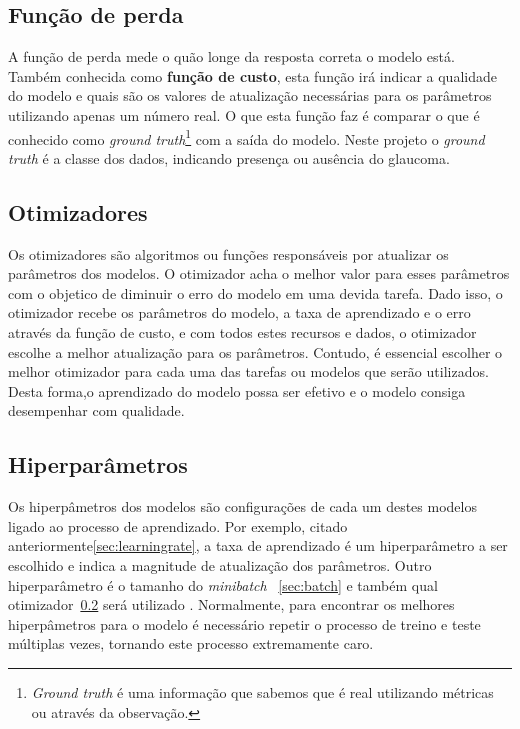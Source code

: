 \documentclass[ %
	msc, %
	portugues %
]{../ppgccufmg}
\begin{document}
    \subsection{Função de perda}\label{sec:loss}

    A função de perda mede o quão longe da resposta correta o modelo está. Também conhecida como
    \textbf{função de custo}, esta função irá indicar a qualidade do modelo e quais são os valores
    de atualização necessárias para os parâmetros utilizando apenas um número real. O que esta função faz é
    comparar o que é conhecido como \textit{ground truth}\footnote{\textit{Ground truth} é uma
    informação que sabemos que é real utilizando métricas ou através da observação.} com a saída do
    modelo. Neste projeto o \textit{ground truth} é a classe dos dados, indicando presença ou
    ausência do glaucoma.

    \subsection{Otimizadores}\label{sec:optimizer}

    Os otimizadores são algoritmos ou funções responsáveis por atualizar os parâmetros dos modelos.
    O otimizador acha o melhor valor para esses parâmetros com o objetico de diminuir o erro do modelo
    em uma devida tarefa. Dado isso, o otimizador recebe os parâmetros do modelo, a taxa de
    aprendizado e o erro através da função de custo, e com todos estes recursos e dados, o otimizador escolhe a
    melhor atualização para os parâmetros. Contudo, é essencial escolher o melhor
    otimizador para cada uma das tarefas ou modelos que serão utilizados. Desta forma,o aprendizado
    do modelo possa ser efetivo e o modelo consiga desempenhar com qualidade.

    \subsection{Hiperparâmetros}\label{sec:hyper}

    Os hiperpâmetros dos modelos são configurações de cada um destes modelos ligado ao processo de
    aprendizado. Por exemplo, citado anteriormente\ref{sec:learningrate}, a taxa de aprendizado é
    um hiperparâmetro a ser escolhido e indica a magnitude de atualização dos parâmetros. Outro
    hiperparâmetro é o tamanho do \textit{minibatch}
   ~\ref{sec:batch} e também qual otimizador~\ref{sec:optimizer} será utilizado \citep{GoodBengCour16}. Normalmente, para
    encontrar os melhores hiperpâmetros para o modelo é necessário repetir o processo de treino e
    teste múltiplas vezes, tornando este processo extremamente caro.
\end{document}
